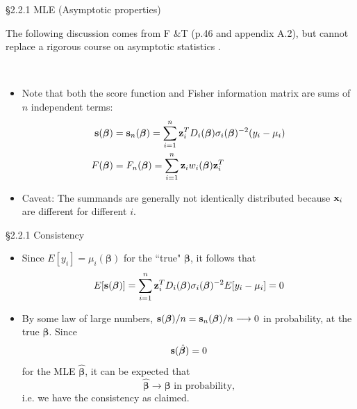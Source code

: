 \documentclass{beamer}
\newcommand{\boldbeta}{{\boldsymbol \beta}}
\begin{document}
\begin{frame} {\S2.2.1  MLE (Asymptotic properties)}

The following discussion comes from F \&T (p.46 and  appendix A.2), but cannot replace a rigorous course on asymptotic statistics \cite{ferguson1996}.

\ \

\begin{itemize}

\item
Note that both the score function and Fisher information matrix are sums of $n$ independent terms:
\begin{align*}
{\bf s}({\boldsymbol \beta}) &= {\bf s}_n ({\boldsymbol \beta}) = \sum_{i=1}^n {\bf z}_i^T D_i(\boldbeta) \sigma_i(\boldbeta)^{-2} (y_i - \mu_i) \\
F({\boldsymbol \beta}) &= F_n({\boldsymbol \beta})  =  \sum_{i=1}^n {\bf z}_i w_i(\boldbeta){\bf z}_i^T \\
\end{align*}
\item Caveat: The summands are generally not identically distributed because ${\bf x}_i$ are different for different $i$.

\end{itemize}

\end{frame}

\begin{frame} {\S2.2.1  Consistency}
\begin{itemize}
\item Since $E[y_i] = \mu_i(\boldbeta)$ for the ``true" $\boldbeta$, it follows that
\[
E[{\bf s}({\boldsymbol \beta})] = \sum_{i=1}^n {\bf z}_i^T D_i(\boldbeta) \sigma_i(\boldbeta)^{-2}  E[y_i - \mu_i] = 0
\]


\item By some law of large numbers, ${\bf s} (\boldbeta)/n =  {\bf s}_n (\boldbeta)/n \longrightarrow 0$ in probability, at the true $\boldbeta$. Since 
\[
{\bf s} (\hat{\boldbeta}) = 0
\]
 for the MLE $\hat{\boldbeta}$, it can be expected that 
 \[
 \hat{\boldbeta} \rightarrow \boldbeta \text{ in probability,}
 \]
   i.e.  we have the  consistency as claimed. 
\end{itemize}
\end{frame}
\end{document}
